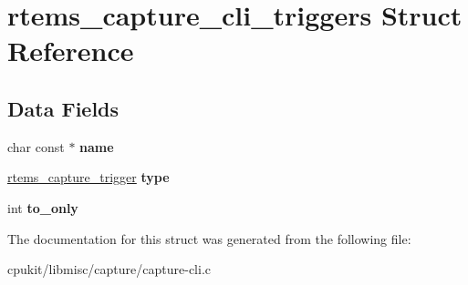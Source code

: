 \hypertarget{structrtems__capture__cli__triggers}{}\section{rtems\+\_\+capture\+\_\+cli\+\_\+triggers Struct Reference}
\label{structrtems__capture__cli__triggers}
\subsection*{Data Fields}
\begin{DoxyCompactItemize}
\item 
\mbox{\label{structrtems__capture__cli__triggers_aa22e8eee3207254eb6c0976868f85c65}} 
char const  $\ast$ {\bfseries name}
\item 
\mbox{\label{structrtems__capture__cli__triggers_a8a475e9a8a5af6cf98d69833f6de1155}} 
\mbox{\hyperlink{group__libmisc__capture_ga5fd896f3981ec7db204355a0e527a074}{rtems\+\_\+capture\+\_\+trigger}} {\bfseries type}
\item 
\mbox{\label{structrtems__capture__cli__triggers_abef41562b1f53388843f8ec65c38de94}} 
int {\bfseries to\+\_\+only}
\end{DoxyCompactItemize}


The documentation for this struct was generated from the following file\+:\begin{DoxyCompactItemize}
\item 
cpukit/libmisc/capture/capture-\/cli.\+c\end{DoxyCompactItemize}
